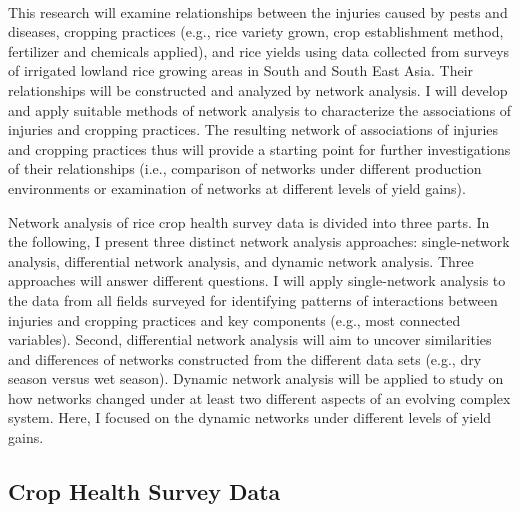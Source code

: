 ﻿﻿%


This research will examine relationships between the injuries caused by pests and diseases, cropping practices (e.g., rice variety grown, crop establishment method, fertilizer and chemicals applied), and rice yields using data collected from surveys of irrigated lowland rice growing areas in South and South East Asia. Their relationships will be constructed and analyzed by network analysis. I will develop and apply suitable methods of network analysis to characterize the associations of injuries and cropping practices. The resulting network of associations of injuries and cropping practices thus will  provide a starting point for further investigations of their relationships (i.e., comparison of networks under different production environments or examination of networks at different levels of yield gains). 

Network analysis of rice crop health survey data is divided into three parts. In the following, I present three distinct network analysis approaches: single-network analysis, differential network analysis, and dynamic network analysis. Three approaches will answer different questions. I will apply single-network analysis to the data from all fields surveyed for identifying patterns of interactions between injuries and cropping practices and key components (e.g., most connected variables). Second, differential network analysis will aim to uncover similarities and differences of networks constructed from the different data sets (e.g., dry season versus wet season). Dynamic network analysis will be applied to study on how networks changed under at least two different aspects of an evolving complex system. Here, I focused on the dynamic networks under different levels of yield gains. 

\subsection*{Crop Health Survey Data}


